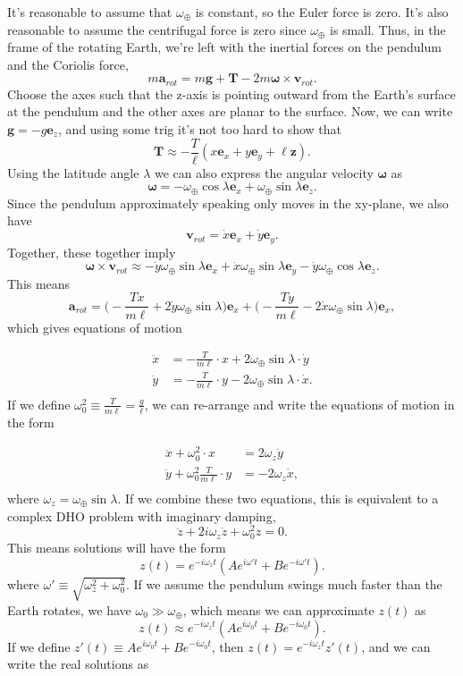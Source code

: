 \documentclass[
  letterpaper,
  DIV=11,
  numbers=noendperiod]{scrreprt}
\begin{document}
It's reasonable to assume that \(\omega_{\oplus}\) is constant, so the
Euler force is zero. It's also reasonable to assume the centrifugal
force is zero since \(\omega_{\oplus}\) is small. Thus, in the frame of
the rotating Earth, we're left with the inertial forces on the pendulum
and the Coriolis force, \[
m\mathbf{a}_{rot} = m\mathbf{g} + \mathbf{T} - 2m\boldsymbol{\omega} \times \mathbf{v}_{rot}.
\] Choose the axes such that the z-axis is pointing outward from the
Earth's surface at the pendulum and the other axes are planar to the
surface. Now, we can write \(\mathbf{g} = -g \mathbf{e}_z\), and using
some trig it's not too hard to show that \[
\mathbf{T} \approx -\frac{T}{\ell} (x \mathbf{e}_x + y \mathbf{e}_y + \ell \mathbf{z}).
\] Using the latitude angle \(\lambda\) we can also express the angular
velocity \(\boldsymbol{\omega}\) as \[
\boldsymbol{\omega} = -\omega_{\oplus}\cos\lambda\mathbf{e}_x + \omega_{\oplus}\sin\lambda\mathbf{e}_z.
\] Since the pendulum approximately speaking only moves in the xy-plane,
we also have \[
\mathbf{v}_{rot} = \dot x \mathbf{e}_x + \dot y \mathbf{e}_y.
\] Together, these together imply \[
\boldsymbol{\omega} \times \mathbf{v}_{rot} \approx -\dot y \omega_{\oplus} \sin\lambda \mathbf{e}_x + \dot x \omega_{\oplus} \sin\lambda \mathbf{e}_y - \dot y \omega_{\oplus} \cos\lambda \mathbf{e}_z.
\] This means \[
\mathbf{a}_{rot} = \bigg(-\frac{Tx}{m\ell} + 2\dot y \omega_{\oplus} \sin\lambda \bigg) \mathbf{e}_x + \bigg(-\frac{Ty}{m\ell} - 2\dot x \omega_{\oplus} \sin\lambda \bigg) \mathbf{e}_x,
\] which gives equations of motion

\[
\begin{align*}
\ddot x &= -\frac{T}{m\ell} \cdot x + 2\omega_{\oplus}\sin\lambda \cdot \dot y \\
\ddot y &= -\frac{T}{m\ell} \cdot y - 2\omega_{\oplus}\sin\lambda \cdot \dot x. \\
\end{align*}
\] If we define \(\omega_0^2 \equiv \frac{T}{m\ell} = \frac{g}{\ell}\),
we can re-arrange and write the equations of motion in the form

\[
\begin{align*}
\ddot x + \omega_0^2 \cdot x &= 2\omega_z \dot y \\
\ddot y + \omega_0^2 \frac{T}{m\ell} \cdot y &= -2\omega_z \dot x, \\
\end{align*}
\] where \(\omega_z = \omega_{\oplus}\sin\lambda\). If we combine these
two equations, this is equivalent to a complex DHO problem with
imaginary damping, \[
\ddot z + 2i\omega_z \dot z + \omega_0^2 z = 0.
\] This means solutions will have the form \[
z(t) = e^{-i\omega_z t}(A e^{i\omega't} + B e^{-i\omega't}).
\] where \(\omega' \equiv \sqrt{\omega_z^2 + \omega_0^2}\). If we assume
the pendulum swings much faster than the Earth rotates, we have
\(\omega_0 \gg \omega_{\oplus}\), which means we can approximate
\(z(t)\) as \[
z(t) \approx e^{-i\omega_z t}(A e^{i\omega_0 t} + B e^{-i\omega_0 t}).
\] If we define \(z'(t) \equiv A e^{i\omega_0 t} + B e^{-i\omega_0 t}\),
then \(z(t) = e^{-i\omega_z t} z'(t)\), and we can write the real
solutions as
\end{document}
